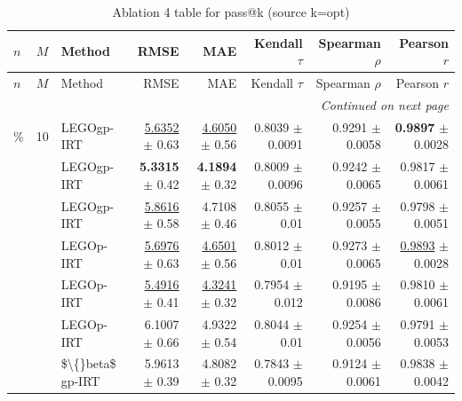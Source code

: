 \footnotesize
\setlength{\tabcolsep}{2pt}
\renewcommand{\arraystretch}{1.05}
\setlength{\LTpre}{0pt}
\setlength{\LTpost}{0pt}
\setlength{\LTleft}{\fill}
\setlength{\LTright}{\fill}
\begin{longtable}{llp{}rrrrr}
\caption{Ablation 4 table for pass@k (source k=opt)}\label{tab:ablation\_4\_passk\_kopt}\\
\toprule
$n$ & $M$ & Method & RMSE & MAE & Kendall $\tau$ & Spearman $\rho$ & Pearson $r$ \\
\midrule
\endfirsthead
\toprule
$n$ & $M$ & Method & RMSE & MAE & Kendall $\tau$ & Spearman $\rho$ & Pearson $r$ \\
\midrule
\endhead
\midrule
\multicolumn{8}{r}{\emph{Continued on next page}} \\
\midrule
\endfoot
\bottomrule
\endlastfoot
5\% & 10 & LEGOgp-IRT & \underline{5.6352} {\scriptsize $\pm$ 0.63} & \underline{4.6050} {\scriptsize $\pm$ 0.56} & 0.8039 {\scriptsize $\pm$ 0.0091} & 0.9291 {\scriptsize $\pm$ 0.0058} & \textbf{0.9897} {\scriptsize $\pm$ 0.0028} \\
 &  & LEGOgp-IRT & \textbf{5.3315} {\scriptsize $\pm$ 0.42} & \textbf{4.1894} {\scriptsize $\pm$ 0.32} & 0.8009 {\scriptsize $\pm$ 0.0096} & 0.9242 {\scriptsize $\pm$ 0.0065} & 0.9817 {\scriptsize $\pm$ 0.0061} \\
 &  & LEGOgp-IRT & \underline{5.8616} {\scriptsize $\pm$ 0.58} & 4.7108 {\scriptsize $\pm$ 0.46} & 0.8055 {\scriptsize $\pm$ 0.01} & 0.9257 {\scriptsize $\pm$ 0.0055} & 0.9798 {\scriptsize $\pm$ 0.0051} \\
 &  & LEGOp-IRT & \underline{5.6976} {\scriptsize $\pm$ 0.63} & \underline{4.6501} {\scriptsize $\pm$ 0.56} & 0.8012 {\scriptsize $\pm$ 0.01} & 0.9273 {\scriptsize $\pm$ 0.0065} & \underline{0.9893} {\scriptsize $\pm$ 0.0028} \\
 &  & LEGOp-IRT & \underline{5.4916} {\scriptsize $\pm$ 0.41} & \underline{4.3241} {\scriptsize $\pm$ 0.32} & 0.7954 {\scriptsize $\pm$ 0.012} & 0.9195 {\scriptsize $\pm$ 0.0086} & 0.9810 {\scriptsize $\pm$ 0.0061} \\
 &  & LEGOp-IRT & 6.1007 {\scriptsize $\pm$ 0.66} & 4.9322 {\scriptsize $\pm$ 0.54} & 0.8044 {\scriptsize $\pm$ 0.01} & 0.9254 {\scriptsize $\pm$ 0.0056} & 0.9791 {\scriptsize $\pm$ 0.0053} \\
 &  & \$\textbackslash\{\}beta\$ gp-IRT & 5.9613 {\scriptsize $\pm$ 0.39} & 4.8082 {\scriptsize $\pm$ 0.32} & 0.7843 {\scriptsize $\pm$ 0.0095} & 0.9124 {\scriptsize $\pm$ 0.0061} & 0.9838 {\scriptsize $\pm$ 0.0042} \\

\end{longtable}
